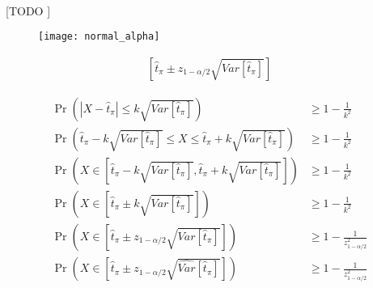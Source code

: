 \documentclass{article}
\begin{document}
    \paragraph{}
    [TODO ]

    \begin{figure}
      \centering
      \texttt{[image: normal\_alpha]}
      \caption{}
      \label{}
    \end{figure}

    \begin{align}
      \left[\widehat{t}_\pi \pm z_{1-\alpha/2}\sqrt{\widehat{Var}[\widehat{t}_\pi]}\right]
    \end{align}

    \begin{align}
      \Pr(|X-\widehat{t}_\pi |\leq k \sqrt{Var[\widehat{t}_\pi]} )&\geq {1-\frac {1}{k^{2}}} \\
      \Pr\left(\widehat{t}_\pi - k \sqrt{Var[\widehat{t}_\pi]} \leq X \leq  \widehat{t}_\pi + k \sqrt{Var[\widehat{t}_\pi]} \right)&\geq {1-\frac {1}{k^{2}}} \\
      \Pr\left(X \in \left[\widehat{t}_\pi - k \sqrt{Var[\widehat{t}_\pi]}, \widehat{t}_\pi + k \sqrt{Var[\widehat{t}_\pi]}\right] \right)&\geq {1-\frac {1}{k^{2}}} \\
      \Pr\left(X \in \left[\widehat{t}_\pi \pm k \sqrt{Var[\widehat{t}_\pi]}\right] \right)&\geq {1-\frac {1}{k^{2}}} \\
      \Pr\left(X \in \left[\widehat{t}_\pi \pm z_{1-\alpha/2} \sqrt{Var[\widehat{t}_\pi]}\right] \right)&\geq {1-\frac {1}{z_{1-\alpha/2}^{2}}} \\
      \Pr\left(X \in \left[\widehat{t}_\pi \pm z_{1-\alpha/2} \sqrt{\widehat{Var}[\widehat{t}_\pi]}\right] \right)&\geq {1-\frac {1}{z_{1-\alpha/2}^{2}}}
    \end{align}

	\nocite{muest2017}
  \nocite{sarndal2003model}

  
  
\end{document}
